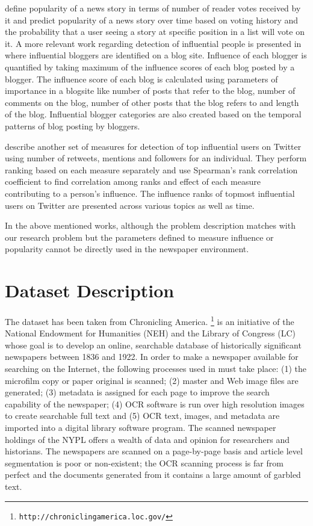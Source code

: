 \documentclass[10pt,journal,compsoc]{IEEEtran}
\begin{document}
\cite{lerman2010using} define popularity of a news story in terms of number of reader votes received by it and predict popularity of a news story over time based on voting history and the probability that a user seeing a story at specific position in a list will vote on it. 
A more relevant work regarding detection of influential people is presented in \cite{agarwal2008identifying} where influential bloggers are identified on a blog site. Influence of each blogger is quantified by taking maximum of the influence scores of each blog posted by a blogger. The influence score of each blog is calculated using parameters of importance in a blogsite like number of posts that refer to the blog, number of comments on the blog, number of other posts that the blog refers to and length of the blog. Influential blogger categories are also created based on the temporal patterns of blog posting by bloggers. 

\cite{cha2010measuring} describe another set of measures for detection of top influential users on Twitter using number of retweets, mentions and followers for an individual. They perform ranking based on each measure separately and use Spearman's rank correlation coefficient to find correlation among ranks and effect of each measure contributing to a person's influence. The influence ranks of topmost influential users on Twitter are presented across various topics as well as time.

In the above mentioned works, although the problem description matches with our research problem but the parameters defined to measure influence or popularity cannot be directly used in the newspaper environment. 

\section{Dataset Description}
The dataset has been taken from Chronicling America.
\footnote{\texttt{http://chroniclingamerica.loc.gov/}} is an
initiative of the National Endowment for Humanities (NEH) and the
Library of Congress (LC) whose goal is to develop an online,
searchable database of historically significant newspapers between
1836 and 1922. 
In order to make a newspaper available for searching on the Internet,
the following processes used in \cite{dutta2011learning} must take place: (1) the microfilm copy or
paper original is scanned; (2) master and Web image files are
generated; (3) metadata is assigned for each page to improve the
search capability of the newspaper; (4) OCR software is run over high
resolution images to create searchable full text and (5) OCR text,
images, and metadata are imported into a digital library software
program. The scanned newspaper holdings of the NYPL offers a wealth of
data and opinion for researchers and historians.
The newspapers are scanned on a page-by-page basis and article level
segmentation is poor or non-existent; the OCR scanning process is far
from perfect and the documents generated from it contains a large
amount of garbled text.
\end{document}

